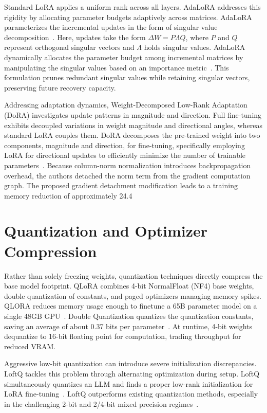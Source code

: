 \documentclass[11pt,a4paper]{article}
\begin{document}
Standard LoRA applies a uniform rank across all layers. AdaLoRA addresses this rigidity by allocating parameter budgets adaptively across matrices. AdaLoRA parameterizes the incremental updates in the form of singular value decomposition~\cite{zhang2023adalora}. Here, updates take the form $\Delta W = P \Lambda Q$, where $P$ and $Q$ represent orthogonal singular vectors and $\Lambda$ holds singular values. AdaLoRA dynamically allocates the parameter budget among incremental matrices by manipulating the singular values based on an importance metric~\cite{zhang2023adalora}. This formulation prunes redundant singular values while retaining singular vectors, preserving future recovery capacity.

Addressing adaptation dynamics, Weight-Decomposed Low-Rank Adaptation (DoRA) investigates update patterns in magnitude and direction. Full fine-tuning exhibits decoupled variations in weight magnitude and directional angles, whereas standard LoRA couples them. DoRA decomposes the pre-trained weight into two components, magnitude and direction, for fine-tuning, specifically employing LoRA for directional updates to efficiently minimize the number of trainable parameters~\cite{liu2024dora}. Because column-norm normalization introduces backpropagation overhead, the authors detached the norm term from the gradient computation graph. The proposed gradient detachment modification leads to a training memory reduction of approximately 24.4%

\section{Quantization and Optimizer Compression}
Rather than solely freezing weights, quantization techniques directly compress the base model footprint. QLoRA combines 4-bit NormalFloat (NF4) base weights, double quantization of constants, and paged optimizers managing memory spikes. QLORA reduces memory usage enough to finetune a 65B parameter model on a single 48GB GPU~\cite{dettmers2023qlora}. Double Quantization quantizes the quantization constants, saving an average of about 0.37 bits per parameter~\cite{dettmers2023qlora}. At runtime, 4-bit weights dequantize to 16-bit floating point for computation, trading throughput for reduced VRAM.

Aggressive low-bit quantization can introduce severe initialization discrepancies. LoftQ tackles this problem through alternating optimization during setup. LoftQ simultaneously quantizes an LLM and finds a proper low-rank initialization for LoRA fine-tuning~\cite{li2023loftq}. LoftQ outperforms existing quantization methods, especially in the challenging 2-bit and 2/4-bit mixed precision regimes~\cite{li2023loftq}.
\end{document}
